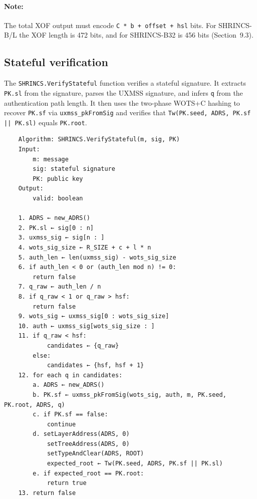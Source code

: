 \paragraph{Note:} The total XOF output must encode \texttt{C * b + offset + hsl} bits. For SHRINCS-B/L the XOF length is 472 bits, and for SHRINCS-B32 is 456 bits (Section~9.3).

\subsection{Stateful verification}
The \texttt{SHRINCS.VerifyStateful} function verifies a stateful signature. It extracts \texttt{PK.sl} from the signature, parses the UXMSS signature, and infers \texttt{q} from the authentication path length. It then uses the two-phase WOTS+C hashing to recover \texttt{PK.sf} via \texttt{uxmss\_pkFromSig} and verifies that \texttt{Tw(PK.seed, ADRS, PK.sf || PK.sl)} equals \texttt{PK.root}.
\begin{verbatim}
    Algorithm: SHRINCS.VerifyStateful(m, sig, PK)
    Input:
        m: message
        sig: stateful signature
        PK: public key
    Output:
        valid: boolean

    1. ADRS ← new_ADRS()
    2. PK.sl ← sig[0 : n]
    3. uxmss_sig ← sig[n : ]
    4. wots_sig_size ← R_SIZE + c + l * n
    5. auth_len ← len(uxmss_sig) - wots_sig_size
    6. if auth_len < 0 or (auth_len mod n) != 0:
        return false
    7. q_raw ← auth_len / n
    8. if q_raw < 1 or q_raw > hsf:
        return false
    9. wots_sig ← uxmss_sig[0 : wots_sig_size]
    10. auth ← uxmss_sig[wots_sig_size : ]
    11. if q_raw < hsf:
            candidates ← {q_raw}
        else:
            candidates ← {hsf, hsf + 1}
    12. for each q in candidates:
        a. ADRS ← new_ADRS()
        b. PK.sf ← uxmss_pkFromSig(wots_sig, auth, m, PK.seed, PK.root, ADRS, q)
        c. if PK.sf == false:
            continue
        d. setLayerAddress(ADRS, 0)
            setTreeAddress(ADRS, 0)
            setTypeAndClear(ADRS, ROOT)
            expected_root ← Tw(PK.seed, ADRS, PK.sf || PK.sl)
        e. if expected_root == PK.root:
            return true
    13. return false
\end{verbatim}

